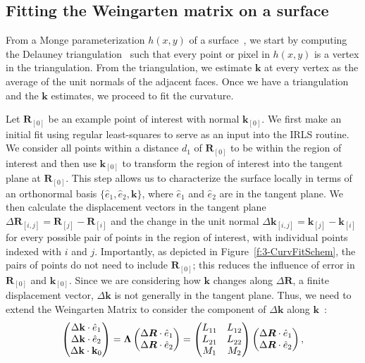 \subsection{Fitting the Weingarten matrix on a surface}
From a Monge parameterization $h(x,y)$ of a surface~\cite{RN35,RN23}, we start by computing the Delauney triangulation~\cite{RN34} such that every point or pixel in $h(x,y)$ is a vertex in the triangulation.
From the triangulation, we estimate $\mathbf{k}$ at every vertex as the average of the unit normals of the adjacent faces.
Once we have a triangulation and the $\mathbf{k}$ estimates, we proceed to fit the curvature.

Let $\mathbf{R}_{[0]}$ be an example point of interest with normal $\mathbf{k}_{[0]}$.
We first make an initial fit using regular least-squares to serve as an input into the IRLS routine.
We consider all points within a distance $d_1$ of $\mathbf{R}_{[0]}$ to be within the region of interest and then use $\mathbf{k}_{[0]}$ to transform the region of interest into the tangent plane at $\mathbf{R}_{[0]}$.
This step allows us to characterize the surface locally in terms of an orthonormal basis $\{\hat{e}_1,\hat{e}_2,\mathbf{k}\}$, where $\hat{e}_1$ and $\hat{e}_2$ are in the tangent plane.
We then calculate the displacement vectors in the tangent plane $\Delta \mathbf{R}_{[i,j]} = \mathbf{R}_{[j]}-\mathbf{R}_{[i]}$ and the change in the unit normal $\Delta \mathbf{k}_{[i,j]} = \mathbf{k}_{[j]}-\mathbf{k}_{[i]}$ for every possible pair of points in the region of interest, with individual points indexed with $i$ and $j$.
Importantly, as depicted in Figure~\ref{f:3-CurvFitSchem}, the pairs of points do not need to include $\mathbf{R}_{[0]}$; this reduces the influence of error in $\mathbf{R}_{[0]}$ and $\mathbf{k}_{[0]}$.
Since we are considering how $\mathbf{k}$ changes along $\Delta \mathbf{R}$, a finite displacement vector, $\Delta \mathbf{k}$ is not generally in the tangent plane.
Thus, we need to extend the Weingarten Matrix to consider the component of $\Delta \mathbf{k}$ along $\mathbf{k}$~\cite{RN31,RN32}:
\begin{equation}
\begin{pmatrix}
\Delta \mathbf{k} \cdot \hat{e}_1 \\
\Delta \mathbf{k} \cdot \hat{e}_2 \\
\Delta \mathbf{k} \cdot \mathbf{k}_0
\end{pmatrix}
=
\bm{\Lambda}
\begin{pmatrix}
\Delta \bm{R} \cdot \hat{e}_1 \\
\Delta \bm{R} \cdot \hat{e}_2
\end{pmatrix}
=
\begin{pmatrix}
\tensor{L}{_1_1} & \tensor{L}{_1_2} \\
\tensor{L}{_2_1} & \tensor{L}{_2_2} \\
M_{1} & M_{2}
\end{pmatrix}
\begin{pmatrix}
\Delta \bm{R} \cdot \hat{e}_1 \\
\Delta \bm{R} \cdot \hat{e}_2
\end{pmatrix},
\label{e:3-Kfit2}
\end{equation}
